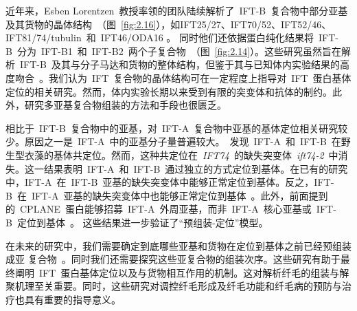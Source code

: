 近年来，Esben Lorentzen\ 教授率领的团队陆续解析了\ IFT-B\ 复合物中部分亚基及其货物的晶体结构\ （图\ \ref{fig:2.16}），如IFT25/27、IFT70/52、IFT52/46、IFT81/74/tubulin\ 和\ IFT46/ODA16 \citep{Bhogaraju2011,Taschner2014,Taschner2017,Bhogaraju2013a,Bhogaraju2014}。 同时他们还依据蛋白纯化结果将\ IFT-B\ 分为\ IFT-B1\ 和\ IFT-B2\ 两个子复合物\ （图\ \ref{fig:2.14}）\citep{Taschner2016a}。这些研究虽然旨在解析\ IFT-B\ 及其与分子马达和货物的整体结构，但鉴于其与已知体内实验结果的高度吻合\ \citep{Kubo2016,Craft2015,Ahmed2008}。我们认为\ IFT\ 复合物的晶体结构可在一定程度上指导对\ IFT\ 蛋白基体定位的相关研究。然而，体内实验长期以来受到有限的突变体和抗体的制约。此外，研究多亚基复合物组装的方法和手段也很匮乏。

相比于\ IFT-B\ 复合物中的亚基，对\ IFT-A\ 复合物中亚基的基体定位相关研究较少。原因之一是\ IFT-A\ 中的亚基分子量普遍较大。\citet{Brown2015}\ 发现\ IFT-A\ 和\ IFT-B\ 在野生型衣藻的基体共定位。然而，这种共定位在\ \textit{IFT74}\ 的缺失突变体\ \textit{ift74-2}\ 中消失。这一结果表明\ IFT-A\ 和\ IFT-B\ 通过独立的方式定位到基体。在已有的研究中，IFT-A\ 在\ IFT-B\ 亚基的缺失突变体中能够正常定位到基体。反之，IFT-B\ 在\ IFT-A\ 亚基的缺失突变体中也能够正常定位到基体\ \citep{Behal2012,Brown2015,Hou2007,Richey2012}。此外，前面提到的\ CPLANE\ 蛋白能够招募\ IFT-A\ 外周亚基，而非\ IFT-A\ 核心亚基或\ IFT-B\ 定位到基体\ \citep{Toriyama2016}。 这些结果进一步验证了“预组装-定位”模型。

在未来的研究中，我们需要确定到底哪些亚基和货物在定位到基体之前已经预组装成亚
复合物\ \citep{Lechtreck2015,Lechtreck2017,Taschner2016,Fu2016}。同时我们还需要探究这些亚复合物的组装次序。这些研究有助于最终阐明\ IFT\ 蛋白基体定位以及与货物相互作用的机制。这对解析纤毛的组装与解聚机理至关重要。同时，这些研究对调控纤毛形成及纤毛功能和纤毛病的预防与治疗也具有重要的指导意义。